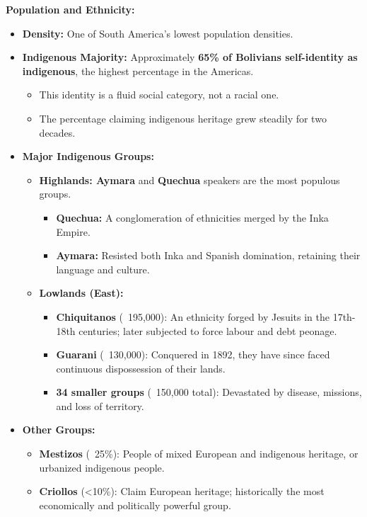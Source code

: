 \documentclass{article}
\begin{document}
    \noindent \textbf{Population and Ethnicity:}
    \begin{itemize}
        \item \textbf{Density:} One of South America's lowest population
        densities.
        \item \textbf{Indigenous Majority:} Approximately
        \textbf{65\% of Bolivians self-identity as indigenous}, the highest
        percentage in the Americas.
        \begin{itemize}
            \item This identity is a fluid social category, not a racial one.
            \item The percentage claiming indigenous heritage grew steadily
            for two decades.
        \end{itemize}
        \item \textbf{Major Indigenous Groups:}
        \begin{itemize}
            \item \textbf{Highlands: Aymara} and \textbf{Quechua} speakers
            are the most populous groups.
            \begin{itemize}
                \item \textbf{Quechua:} A conglomeration of ethnicities
                merged by the Inka Empire.
                \item \textbf{Aymara:} Resisted both Inka and Spanish
                domination, retaining their language and culture.
            \end{itemize}
            \item \textbf{Lowlands (East):}
            \begin{itemize}
                \item \textbf{Chiquitanos} (~195,000): An ethnicity forged
                by Jesuits in the 17th-18th centuries; later subjected to
                force labour and debt peonage.
                \item \textbf{Guarani} (~130,000): Conquered in 1892, they
                have since faced continuous dispossession of their lands.
                \item \textbf{34 smaller groups} (~150,000 total):
                Devastated by disease, missions, and loss of territory.
            \end{itemize}
        \end{itemize}
        \item \textbf{Other Groups:}
        \begin{itemize}
            \item \textbf{Mestizos} (~25\%): People of mixed European and
            indigenous heritage, or urbanized indigenous people.
            \item \textbf{Criollos} (<10\%): Claim European heritage;
            historically the most economically and politically powerful group.
        \end{itemize}
    \end{itemize}
\end{document}
